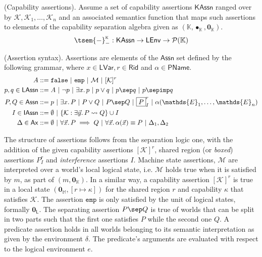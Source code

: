 \begin{param}
	(Capability assertions).
	Assume a set of capability assertions $\mathsf{KAssn}$ ranged over by $\mathcal{K}, \mathcal{K}_1, \ldots, \mathcal{K}_n$ and an associated semantics function that maps such assertions to elements of the capability separation algebra given as $(\mathbb{K}, \bullet_\mathbb{K}, \mathbf{0}_\mathbb{K})$.
	\[
		\tsem{-}_-^\textsc{k} : \mathsf{KAssn} \rightarrow \mathsf{LEnv} \rightarrow \mathcal{P}(\mathbb{K})
	\]
\end{param}

 (Assertion syntax). Assertions are elements of the $\mathsf{Assn}$ set defined by the following grammar, where $x \in \mathsf{LVar}, r \in \mathsf{Rid}$ and $\alpha \in \mathsf{PName}$. 
\begin{align*}
A &::= \mathtt{false}\ |\ \mathtt{emp}\ |\ \mathcal{M}\ |\ [\mathcal{K}]^r \\
p, q \in \mathsf{LAssn} &::= A\ |\ \lnot p\ |\ \exists x \ldotp p\ |\ p \lor q\ |\ p \sep q\ |\ p \sepimp q \\
P, Q \in \mathsf{Assn} &::= p\ |\ \exists x \ldotp P\ |\ P \lor Q\ |\ P \sep Q\ |\ \boxed{P}_I^r\ |\ \alpha(\mathds{E}_1, \ldots, \mathds{E}_n) \\
I \in \mathsf{IAssn} &::= \emptyset\ |\ \{ \mathcal{K} : \exists \vec{y} \ldotp P \leadsto Q \} \cup I \\
\Delta \in \mathsf{Ax} &::= \emptyset\ |\ \forall \vec{x} \ldotp P \implies Q\ |\ \forall \vec{x} \ldotp \alpha(\vec{x}) \equiv P\ |\ \Delta_1, \Delta_2
\end{align*}

The structure of assertions follows from the separation logic one, with the addition of the given capability assertions $[\mathcal{K}]^r$, shared region (or \textit{boxed}) assertions $\boxed{P}^r_I$ and \textit{interference} assertions $I$. Machine state assertions, $\mathcal{M}$ are interpreted over a world's local logical state, i.e. $\mathcal{M}$ holds true when it is satisfied by $m$, as part of $(m, \mathbf{0}_\mathbb{K})$. In a similar way, a capability assertion $[\mathcal{K}]^r$ is true in a local state $(\mathbf{0}_\mathbb{M}, [r \mapsto \kappa])$ for the shared region $r$ and capability $\kappa$ that satisfies $\mathcal{K}$. The assertion $\mathtt{emp}$ is only satisfied by the unit of logical states, formally $\mathbf{0}_\mathsf{L}$. The separating assertion $P \sep Q$ is true of worlds that can be split in two parts such that the first one satisfies $P$ while the second one $Q$. A predicate assertion holds in all worlds belonging to its semantic interpretation as given by the environment $\delta$. The predicate's arguments are evaluated with respect to the logical environment $e$.


